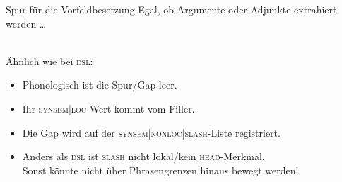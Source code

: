 \begin{frame}
  {Spur für die Vorfeldbesetzung}
  \onslide<+->
  \onslide<+->
  Egal, ob Argumente oder Adjunkte extrahiert werden \ldots\\
  \onslide<+->
  \Zeile
  \centering 
  \\
  \onslide<+->
  \Zeile
  \raggedright
  Ähnlich wie bei \textsc{dsl}:\\
  \Halbzeile
  \begin{itemize}[<+->]
    \item Phonologisch ist die \alert{Spur\slash Gap} leer.
    \item Ihr \textsc{synsem|loc}-Wert  kommt vom \alert{Filler}.
    \item Die Gap wird auf der \alert{\textsc{synsem|nonloc|slash}-Liste} registriert.
    \item Anders als \textsc{dsl} ist \textsc{slash} \alert{nicht lokal\slash kein \textsc{head}-Merkmal}.\\
      Sonst könnte nicht über Phrasengrenzen hinaus bewegt werden!
  \end{itemize}
\end{frame}

\newcommand{\AvmHa}{%
  \scalebox{0.4}{\gruen{%
    \begin{avm}
      \[
        phon & \<\> \\
        snynsem & \[
          loc & \gruen{\@1} \[ cat|head & \@2 \[ dsl & \gruen{\@1} \]\] \\
          nonloc & \[slash & \<\> \] \\
        \] \\
      \]
    \end{avm}
  }}
}

\newcommand{\AvmHb}{%
  \scalebox{0.4}{\orongsch{%
    \begin{avm}
      \[
        phon & \<\> \\
        synsem & \rot{\@5} \[
          loc & \orongsch{\@3} \\
          nonloc|slash & \<\orongsch{\@3}\> \\
        \]
      \]
    \end{avm}
  }}
}

